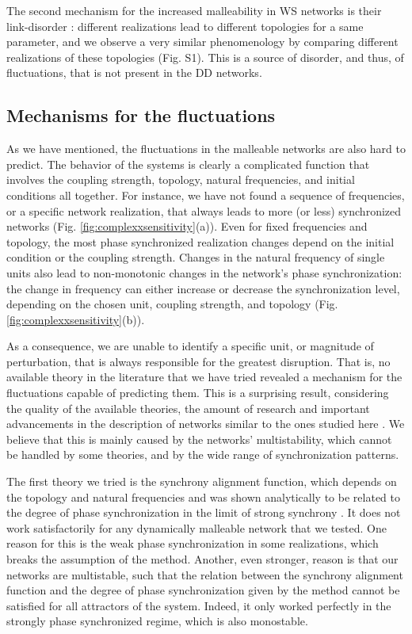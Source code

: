 The second mechanism for the increased malleability in WS networks is their link-disorder \cite{hong2013link}: different realizations lead to different topologies for a same parameter, and we observe a very similar phenomenology by comparing different realizations of these topologies (Fig. S1). This is a source of disorder, and thus, of fluctuations, that is not present in the DD networks. 


\subsection*{Mechanisms for the fluctuations}
As we have mentioned, the fluctuations in the malleable networks are also hard to predict. The behavior of the systems is clearly a complicated function that involves the coupling strength, topology, natural frequencies, and initial conditions all together. For instance, we have not found a sequence of frequencies, or a specific network realization, that always leads to more (or less) synchronized networks (Fig. \ref{fig:complexxsensitivity}(a)). Even for fixed frequencies and topology, the most phase synchronized realization changes depend on the initial condition or the coupling strength. Changes in the natural frequency of single units also lead to non-monotonic changes in the network's phase synchronization: the change in frequency can either increase or decrease the synchronization level, depending on the chosen unit, coupling strength, and topology (Fig. \ref{fig:complexxsensitivity}(b)).

As a consequence, we are unable to identify a specific unit, or magnitude of perturbation, that is always responsible for the greatest disruption. That is, no available theory in the literature that we have tried revealed a mechanism for the fluctuations capable of predicting them. This is a surprising result, considering the quality of the available theories, the amount of research and important advancements in the description of networks similar to the ones studied here \cite{peter2018transition, skardal2014optimal, brede2008synchrony, carareto2009optimized}. We believe that this is mainly caused by the networks' multistability, which cannot be handled by some theories, and by the wide range of synchronization patterns. 

The first theory we tried is the synchrony alignment function, which depends on the topology and natural frequencies and was shown analytically to be related to the degree of phase synchronization in the limit of strong synchrony \cite{skardal2014optimal}. It does not work satisfactorily for any dynamically malleable network that we tested. One reason for this is the weak phase synchronization in some realizations, which breaks the assumption of the method. Another, even stronger, reason is that our networks are multistable, such that the relation between the synchrony alignment function and the degree of phase synchronization given by the method cannot be satisfied for all attractors of the system. Indeed, it only worked perfectly in the strongly phase synchronized regime, which is also monostable.


